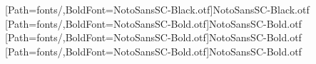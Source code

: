 \setmainfont{Times New Roman}
[Path=fonts/,BoldFont=NotoSansSC-Black.otf]{NotoSansSC-Black.otf}
[Path=fonts/,BoldFont=NotoSansSC-Bold.otf]{NotoSansSC-Bold.otf}
[Path=fonts/,BoldFont=NotoSansSC-Bold.otf]{NotoSansSC-Bold.otf}
[Path=fonts/,BoldFont=NotoSansSC-Bold.otf]{NotoSansSC-Bold.otf}
